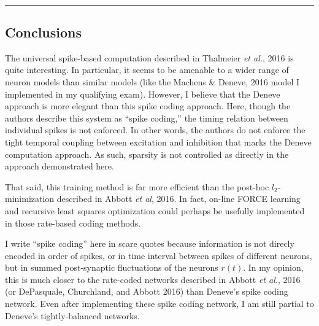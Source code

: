 \documentclass[11pt]{article}
\begin{document}
    \begin{center}
    \end{center}
    { \hspace*{\fill} \\}
    
    \begin{center}\rule{0.5\linewidth}{\linethickness}\end{center}

\hypertarget{conclusions}{%
\subsection{Conclusions}\label{conclusions}}

    The universal spike-based computation described in Thalmeier \emph{et
al.}, 2016 is quite interesting. In particular, it seems to be amenable
to a wider range of neuron models than similar models (like the Machens
\& Deneve, 2016 model I implemented in my qualifying exam). However, I
believe that the Deneve approach is more elegant than this spike coding
approach. Here, though the authors describe this system as ``spike
coding,'' the timing relation between individual spikes is not enforced.
In other words, the authors do not enforce the tight temporal coupling
between excitation and inhibition that marks the Deneve computation
approach. As such, sparsity is not controlled as directly in the
approach demonstrated here.

That said, this training method is far more efficient than the post-hoc
\(l_2\)-minimization described in Abbott \emph{et al}, 2016. In fact,
on-line FORCE learning and recursive least squares optimization could
perhaps be usefully implemented in those rate-based coding methods.

I write ``spike coding'' here in scare quotes because information is not
direcly encoded in order of spikes, or in time interval between spikes
of different neurons, but in summed post-synaptic fluctuations of the
neurons \(r(t)\). In my opinion, this is much closer to the rate-coded
networks described in Abbott \emph{et al.}, 2016 (or DePasquale,
Churchland, and Abbott 2016) than Deneve's spike coding network. Even
after implementing these spike coding network, I am still partial to
Deneve's tightly-balanced networks.


    
    
    
    
\end{document}
